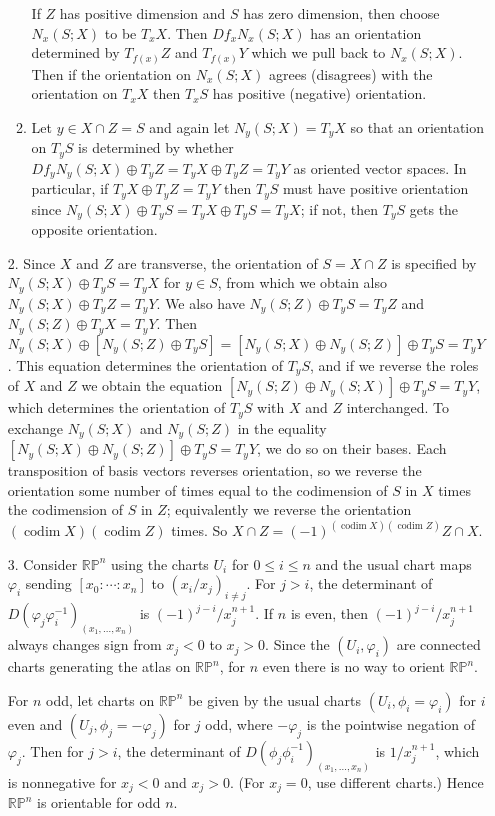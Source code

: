 \documentclass[11pt,leqno]{article}
\theoremstyle{plain}
\theoremstyle{definition}
\numberwithin{equation}{section}
\numberwithin{lem}{section}
\DeclareMathOperator{\codim}{codim}
\begin{document}
\begin{enumerate}
\begin{enumerate}
        If $Z$ has positive dimension and $S$ has zero dimension, then choose $N_x(S;X)$ to be $T_xX$. Then $Df_xN_x(S;X)$ has an orientation determined by $T_{f(x)}Z$ and $T_{f(x)}Y$ which we pull back to $N_x(S;X)$. Then if the orientation on $N_x(S;X)$ agrees (disagrees) with the orientation on $T_xX$ then $T_xS$ has positive (negative) orientation.
        \item Let $y\in X\cap Z = S$ and again let $N_y(S;X) = T_yX$ so that an orientation on $T_yS$ is determined by whether $Df_yN_y(S;X) \oplus T_yZ = T_yX \oplus T_yZ = T_yY$ as oriented vector spaces. In particular, if $T_yX \oplus T_yZ = T_yY$ then $T_yS$ must have positive orientation since $N_y(S;X) \oplus T_yS = T_yX \oplus T_yS = T_yX$; if not, then $T_yS$ gets the opposite orientation.
    \end{enumerate}
    \item[2.] Since $X$ and $Z$ are transverse, the orientation of $S = X\cap Z$ is specified by $N_y(S;X) \oplus T_yS = T_yX$ for $y\in S$, from which we obtain also $N_y(S;X)\oplus T_yZ = T_yY$. We also have $N_y(S;Z)\oplus T_yS = T_yZ$ and $N_y(S;Z)\oplus T_yX = T_yY$. Then $N_y(S;X)\oplus [N_y(S;Z)\oplus T_yS] = [N_y(S;X)\oplus  N_y(S;Z)] \oplus T_yS = T_yY$. This equation determines the orientation of $T_yS$, and if we reverse the roles of $X$ and $Z$ we obtain the equation $[N_y(S;Z)\oplus  N_y(S;X)] \oplus T_yS = T_yY$, which determines the orientation of $T_yS$ with $X$ and $Z$ interchanged. To exchange $N_y(S;X)$ and $N_y(S;Z)$ in the equality $[N_y(S;X)\oplus  N_y(S;Z)] \oplus T_yS = T_yY$, we do so on their bases. Each transposition of basis vectors reverses orientation, so we reverse the orientation some number of times equal to the codimension of $S$ in $X$ times the codimension of $S$ in $Z$; equivalently we reverse the orientation $(\codim X) (\codim Z)$ times. So $X\cap Z = (-1)^{(\codim X)(\codim Z)}Z\cap X$.
    \item[3.] Consider $\mathbb {RP}^n$ using the charts $U_i$ for $0\leq i\leq n$ and the usual chart maps $\varphi_i$ sending $[x_0:\cdots:x_n]$ to $(x_i/x_j)_{i\neq j}$. For $j>i$, the determinant of $D(\varphi_j\varphi_i^{-1})_{(x_1,\dots,x_ n)}$ is $(-1)^{j-i}/x_j^{n+1}$. If $n$ is even, then $(-1)^{j-i}/x_j^{n+1}$ always changes sign from $x_j<0$ to $x_j>0$. Since the $(U_i,\varphi_i)$ are connected charts generating the atlas on $\mathbb {RP}^n$, for $n$ even there is no way to orient $\mathbb {RP}^n$.
    
    For $n$ odd, let charts on $\mathbb {RP}^n$ be given by the usual charts $(U_i,\phi_i = \varphi_i)$ for $i$ even and $(U_j, \phi_j = -\varphi_j)$ for $j$ odd, where $-\varphi_j$ is the pointwise negation of $\varphi_j$. Then for $j>i$, the determinant of $D(\phi_j\phi_i^{-1})_{(x_1,\dots,x_n)}$ is $1/x_j^{n+1}$, which is nonnegative for $x_j<0$ and $x_j>0$. (For $x_j = 0$, use different charts.) Hence $\mathbb {RP}^n$ is orientable for odd $n$.


\end{enumerate}
\end{document}
